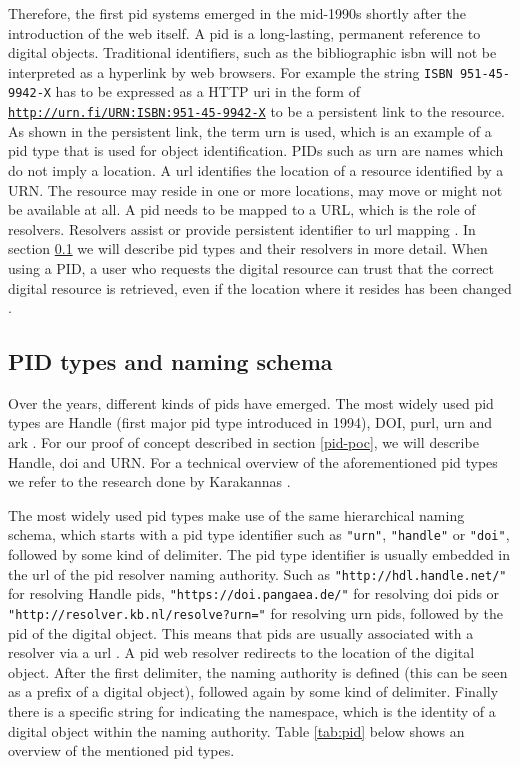 Therefore, the first \gls{pid} systems emerged in the mid-1990s shortly after the introduction of the web itself. A \gls{pid} is a long-lasting, permanent reference to digital objects. Traditional identifiers, such as the bibliographic \gls{isbn} will not be interpreted as a hyperlink by web browsers. For example the string \texttt{ISBN 951-45-9942-X} has to be expressed as a HTTP \gls{uri} in the form of \texttt{\url{http://urn.fi/URN:ISBN:951-45-9942-X}} to be a persistent link to the resource. As shown in the persistent link, the term \gls{urn} is used, which is an example of a \gls{pid} type that is used for object identification. 
PIDs such as \gls{urn} are names which do not imply a location. A \gls{url} identifies the location of a resource identified by a URN. The resource may reside in one or more locations, may move or might not be available at all. A \gls{pid} needs to be mapped to a URL, which is the role of resolvers. Resolvers assist or provide persistent identifier to \gls{url} mapping \cite{rfc1737}. In section \ref{pid-types} we will describe \gls{pid} types and their resolvers in more detail. When using a PID, a user who requests the digital resource can trust that the correct digital resource is retrieved, even if the location where it resides has been changed \cite{pid-oview}.

\subsection{PID types and naming schema}\label{pid-types}
Over the years, different kinds of \glspl{pid} have emerged. The most widely used \gls{pid} types are Handle (first major \gls{pid} type introduced in 1994), DOI, \gls{purl}, \gls{urn} and \gls{ark} \cite{pid-oview, odin, hdl}. For our proof of concept described in section \ref{pid-poc}, we will describe Handle, \gls{doi} and URN. For a technical overview of the aforementioned \gls{pid} types we refer to the research done by Karakannas \cite{icn-bd}. 

The most widely used \gls{pid} types make use of the same hierarchical naming schema, which starts with a \gls{pid} type identifier such as \texttt{"urn"}, \texttt{"handle"} or \texttt{"doi"}, followed by some kind of delimiter. The \gls{pid} type identifier is usually embedded in the \gls{url} of the \gls{pid} resolver naming authority. Such as \texttt{"http://hdl.handle.net/"} for resolving Handle \glspl{pid}, \texttt{"https://doi.pangaea.de/"} for resolving \gls{doi} \glspl{pid} or \texttt{"http://resolver.kb.nl/resolve?urn="} for resolving \gls{urn} \glspl{pid}, followed by the \gls{pid} of the digital object. This means that \glspl{pid} are usually associated with a resolver via a \gls{url} \cite{ids, icn-bd}. A \gls{pid} web resolver redirects to the location of the digital object. After the first delimiter, the naming authority is defined (this can be seen as a prefix of a digital object), followed again by some kind of delimiter. Finally there is a specific string for indicating the namespace, which is the identity of a digital object within the naming authority. Table \ref{tab:pid} below shows an overview of the mentioned \gls{pid} types. 

